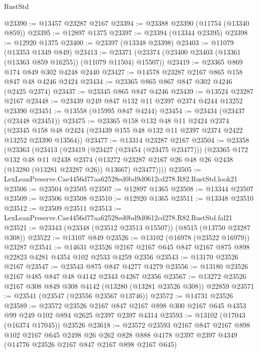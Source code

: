 \begin{lexlean}{RustStd}
\begin{coremodule}
@23390 := @13457 @23287 @2167
@23394 := @23388 @23390 (@11754 (@13340 @859))
@23395 := @12897 @1375
@23397 := @23394 (@13344 @23395)
@23398 := @12920 @1375
@23400 := @23397 (@13348 @23398)
@23403 := @11079 (@13353 @1349 @849)
@23413 := @23371 (@23374 (@23400 @23403 (@13361 (@13363 @859 @16255)) (@11079 @11504) @15507))
@23419 := @23365 @869 @174 @849 @302 @4248 @2440
@23427 := @14578 @23287 @2167 @865 @158 @847 @48 @4246 @2424
@23434 := @23365 @865 @867 @847 @302 @4246 (@2425 @2374)
@23437 := @23345 @865 @847 @4246
@23439 := @13524 @23287 @2167
@23448 := @23439 @249 @847 @132 @11 @2397 @2374 @4244 @13252 @23390
@23451 := @13558 (@15995 @847 @4244)
@23454 := @23434 (@23437 (@23448 @23451))
@23475 := @23365
    @158
    @132
    @48
    @11
    @2424
    @2374
    (@23345 @158 @48 @2424 (@23439 @155 @48 @132 @11 @2397 @2374 @2422 @13252 @23390 @13564))
@23477 := @13314 @23287 @2167
@23504 := @23358
    (@23363
      (@23413
        (@23419
          (@23427 (@23454 (@23475 @23477)))
          (@23365
            @172
            @132
            @48
            @11
            @2438
            @2374
            (@13272 @23287 @2167 @26 @48 @26 @2438 (@13280 (@13281 @23287 @26)) @13667)
            @23477))))
@23505 := LexLeanPreserve.Cae4456d77aa62528ed0bd9d0612cd278.R82.RustStd.look21
@23506 := @23504 @23505
@23507 := @12897 @1365
@23508 := @13344 @23507
@23509 := @23506 @23508
@23510 := @12920 @1365
@23511 := @13348 @23510
@23512 := @23509 @23511
@23513 := LexLeanPreserve.Cae4456d77aa62528ed0bd9d0612cd278.R82.RustStd.fal21
@23521 := @23343 (@23348 (@23512 @23513 @15507)) (@8515 (@13750 @23287 @308))
@23522 := @13107 @849
@23526 := @13102 (@16978 (@23522 @16979)) @23287
@23541 := @14631
    @23526
    @2167
    @2167
    @645
    @847
    @2167
    @875
    @898
    @22823
    @4281
    @4354
    @102
    @2533
    @4259
    @2356
@23543 := @13170 @23526 @2167
@23547 := @23543 @875 @847 @4277 @4279
@23556 := @13180 @23526 @2167 @485 @847 @48 @4142 @2343 @4267 @2356
@23567 := @13272 @23526 @2167 @308 @849 @308 @4142 (@13280 (@13281 @23526 @308)) @22859
@23571 := @23541 (@23547 (@23556 @23567 @13746))
@23572 := @14731 @23526
@23589 := @23572
    @23526
    @2167
    @847
    @2167
    @898
    @300
    @2167
    @645
    @4353
    @99
    @249
    @102
    @894
    @2625
    @2397
    @2397
    @4314
@23593 := @13102 (@17043 (@16374 @17045)) @23526
@23618 := @23572
    @23593
    @2167
    @847
    @2167
    @898
    @102
    @2167
    @645
    @2498
    @26
    @262
    @828
    @888
    @4178
    @2397
    @2397
    @4349
    (@14776 @23526 @2167 @847 @2167 @898 @2167 @645)

\end{coremodule}
\end{lexlean}
